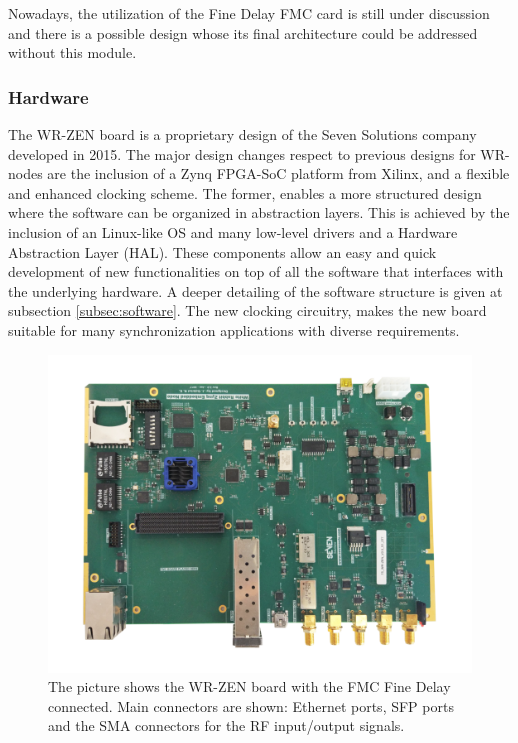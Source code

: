Nowadays, the utilization of the Fine Delay FMC card is still under discussion and there is a possible design whose its final architecture could be addressed without this module.

\subsubsection{Hardware}
\label{subsec:hardware}

The WR-ZEN board is a proprietary design of the Seven Solutions company 
developed in 2015. The major design changes respect to previous designs for 
WR-nodes are the inclusion of a Zynq FPGA-SoC platform from Xilinx, and a 
flexible and enhanced clocking scheme. The former, enables a more structured design where 
the software can be organized in abstraction layers. This is achieved by the 
inclusion of an Linux-like OS and many low-level drivers and a Hardware 
Abstraction Layer (HAL). These components allow an easy and quick 
development of new functionalities on top of all the software that interfaces 
with the underlying hardware. A deeper detailing of the software structure is 
given at subsection \ref{subsec:software}. The new clocking circuitry, makes the new board 
suitable for many synchronization applications with diverse requirements.

\begin{figure}[H]
	\centering
	\includegraphics[width=0.7\linewidth]{img/wrzenv3_scaled}
	\caption[WR-ZEN board picture]{The picture shows the WR-ZEN board with the 
	FMC Fine Delay connected. Main connectors are shown: Ethernet ports, SFP 
	ports and the SMA connectors for the RF input/output signals.}
	\label{fig:wrzen}
\end{figure}

